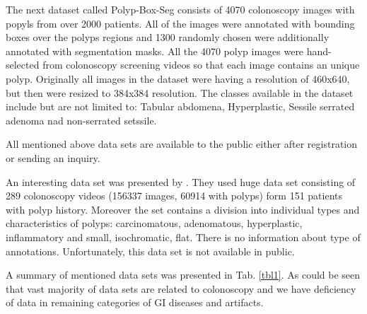 \documentclass[preprint]{article}
\renewcommand{\onecolumn}{}
\newcommand{\tabletextsize}{\tiny}
\begin{document}
The next dataset called Polyp-Box-Seg\cite{Polyp-Box-Seg} consists of 4070 colonoscopy images with popyls from over 2000 patients. All of the images were annotated with bounding boxes over the polyps regions and 1300 randomly chosen were additionally annotated with segmentation masks. All the 4070 polyp images were hand-selected from colonoscopy screening videos so that each image contains an unique polyp. Originally all images in the dataset were having a resolution of 460x640, but then were resized to 384x384 resolution. The classes available in the dataset include but are not limited to: Tabular abdomena, Hyperplastic, Sessile serrated adenoma nad non-serrated setssile.

All mentioned above data sets are available to the public either after registration or sending an inquiry.

An interesting data set was presented by \cite{wang2017}. They used huge data set consisting of 289 colonoscopy videos (156337 images, 60914 with polyps) form 151 patients with polyp history. Moreover the set contains a division into individual types and characteristics of polyps: carcinomatous, adenomatous, hyperplastic, inflammatory and small, isochromatic, flat. There is no information about type of annotations. Unfortunately, this data set is not available in public.

A summary of mentioned data sets was presented in Tab. \ref{tbl1}. As could be seen that vast majority of data sets are related to colonoscopy and we have deficiency of data in remaining categories of GI diseases and artifacts. 

\newcommand{\longcell}{\pretolerance=10 \tolerance=5 \emergencystretch=0pt }



\onecolumn

\tabletextsize
\setlength\tabcolsep{2pt}
\end{document}

